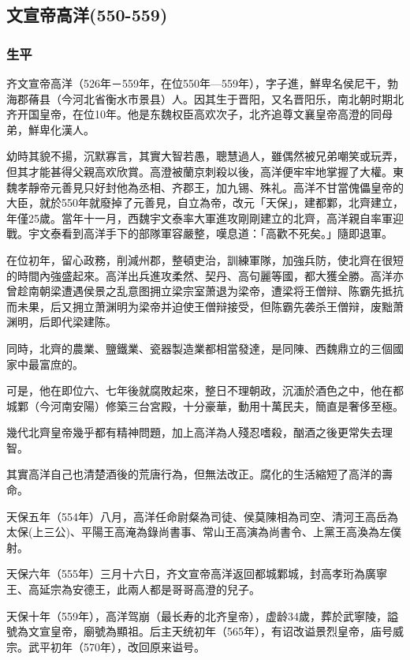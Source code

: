 
\subsection{文宣帝高洋\tiny(550-559)}

\subsubsection{生平}

齐文宣帝高洋（526年－559年，在位550年—559年），字子進，鮮卑名侯尼干，勃海郡蓨县（今河北省衡水市景县）人。因其生于晋阳，又名晋阳乐，南北朝时期北齐开国皇帝，在位10年。他是东魏权臣高欢次子，北齐追尊文襄皇帝高澄的同母弟，鮮卑化漢人。

幼時其貌不揚，沉默寡言，其實大智若愚，聰慧過人，雖偶然被兄弟嘲笑或玩弄，但其才能甚得父親高欢欣賞。高澄被蘭京刺殺以後，高洋便牢牢地掌握了大權。東魏孝靜帝元善見只好封他為丞相、齐郡王，加九锡、殊礼。高洋不甘當傀儡皇帝的大臣，就於550年就廢掉了元善見，自立為帝，改元「天保」，建都鄴，北齊建立，年僅25歲。當年十一月，西魏宇文泰率大軍進攻剛剛建立的北齊，高洋親自率軍迎戰。宇文泰看到高洋手下的部隊軍容嚴整，嘆息道：「高歡不死矣。」隨即退軍。

在位初年，留心政務，削減州郡，整頓吏治，訓練軍隊，加強兵防，使北齊在很短的時間內強盛起來。高洋出兵進攻柔然、契丹、高句麗等國，都大獲全勝。高洋亦曾趁南朝梁遭遇侯景之乱意图拥立梁宗室萧退为梁帝，遭梁将王僧辩、陈霸先抵抗而未果，后又拥立萧渊明为梁帝并迫使王僧辩接受，但陈霸先袭杀王僧辩，废黜萧渊明，后即代梁建陈。

同時，北齊的農業、鹽鐵業、瓷器製造業都相當發達，是同陳、西魏鼎立的三個國家中最富庶的。

可是，他在即位六、七年後就腐敗起來，整日不理朝政，沉湎於酒色之中，他在都城鄴（今河南安陽）修築三台宮殿，十分豪華，動用十萬民夫，簡直是奢侈至極。

幾代北齊皇帝幾乎都有精神問題，加上高洋為人殘忍嗜殺，酗酒之後更常失去理智。

其實高洋自己也清楚酒後的荒唐行為，但無法改正。腐化的生活縮短了高洋的壽命。

天保五年（554年）八月，高洋任命尉粲為司徒、侯莫陳相為司空、清河王高岳為太保(上三公)、平陽王高淹為錄尚書事、常山王高演為尚書令、上黨王高渙為左僕射。

天保六年（555年）三月十六日，齐文宣帝高洋返回都城鄴城，封高孝珩為廣寧王、高延宗為安德王，此兩人都是哥哥高澄的兒子。

天保十年（559年），高洋驾崩（最长寿的北齐皇帝），虚龄34歲，葬於武寧陵，謚號為文宣皇帝，廟號為顯祖。后主天统初年（565年），有诏改谥景烈皇帝，庙号威宗。武平初年（570年），改回原来谥号。

